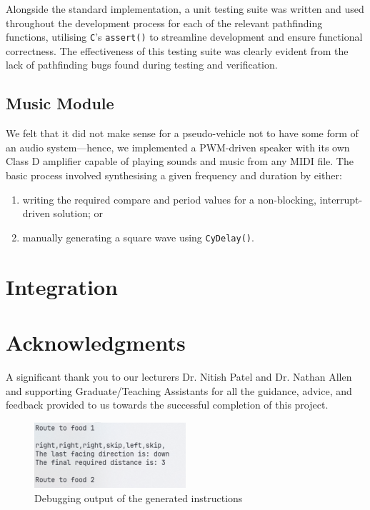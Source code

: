 \documentclass[conference]{IEEEtran}
\begin{document}
Alongside the standard implementation, a unit testing suite was written and used throughout the development process for each of the relevant pathfinding functions, utilising \texttt{C}'s \texttt{assert()} to streamline development and ensure functional correctness.
The effectiveness of this testing suite was clearly evident from the lack of pathfinding bugs found during testing and verification.

\subsection{Music Module}

We felt that it did not make sense for a pseudo-vehicle not to have some form of an audio system—hence, we implemented a PWM-driven speaker with its own Class D amplifier capable of playing sounds and music from any MIDI file.
The basic process involved synthesising a given frequency and duration by either:
\begin{enumerate}
	\item writing the required compare and period values for a non-blocking, interrupt-driven solution; or
	\item manually generating a square wave using \texttt{CyDelay()}.
\end{enumerate}

\section{Integration}



\section*{Acknowledgments}

A significant thank you to our lecturers Dr. Nitish Patel and Dr. Nathan Allen and supporting Graduate/Teaching Assistants for all the guidance, advice, and feedback provided to us towards the successful completion of this project.


\nocite{*}



\appendix

\begin{figure}[htbp]
	\centerline{\includegraphics[width=0.5\textwidth]{pathfinding-instructions.png}}
	\caption{Debugging output of the generated instructions}
	\label{fig:pathfinding-instructions}
\end{figure}
\end{document}
